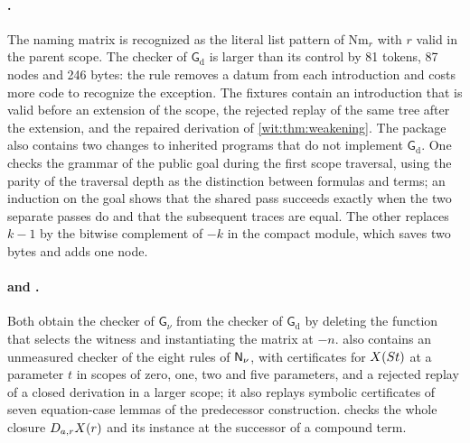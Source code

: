 \paragraph{.}
The naming matrix is recognized as the literal list pattern of
$\mathrm{Nm}_r$ with $r$ valid in the parent scope.  The checker of
$\mathsf{G}_{\mathrm d}$ is larger than its control by 81 tokens, 87 nodes
and 246 bytes: the rule removes a datum from each introduction and costs
more code to recognize the exception.  The fixtures contain an introduction
that is valid before an extension of the scope, the rejected replay of the
same tree after the extension, and the repaired derivation of
\cref{wit:thm:weakening}.  The package also contains two changes to
inherited programs that do not implement $\mathsf{G}_{\mathrm d}$.  One
checks the grammar of the public goal during the first scope traversal,
using the parity of the traversal depth as the distinction between formulas
and terms; an induction on the goal shows that the shared pass succeeds
exactly when the two separate passes do and that the subsequent traces are
equal.  The other replaces $k-1$ by the bitwise complement of $-k$ in the
compact module, which saves two bytes and adds one node.

\paragraph{ and .}
Both obtain the checker of $\mathsf{G}_{\nu}$ from the checker of
$\mathsf{G}_{\mathrm d}$ by deleting the function that selects the witness
and instantiating the matrix at $-n$.   also contains
an unmeasured checker of the eight rules of $\mathsf{N}_{\nu}$, with certificates
for $X(S t)$ at a parameter $t$ in scopes of zero, one, two and five
parameters, and a rejected replay of a closed derivation in a larger scope;
it also replays symbolic certificates of seven equation-case lemmas of the
predecessor construction.
 checks the whole closure $D_{a,r}X(r)$ and its
instance at the successor of a compound term.


